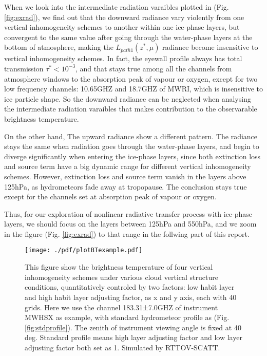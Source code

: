When we look into the intermediate radiation varaibles plotted in (Fig. \ref{fig:exrad}), we find out that the 
downward radiance vary violently from one vertical inhomogeneity schemes to another within one ice-phase layers, but convergent to 
the same value after going through the water-phase layers at the bottom of atmosphere, making the $L_{path1}(z^{*}, \mu)$ radiance 
become insensitive to vertical inhomogeneity schemes. In fact, the eyewall profile always has total transmission $\tau^{*} < 10^{-3}$, 
and that stays true among all the channels from atmosphere windows to the absorption peak of vapour or oxygen, except for 
two low frequency channels: 10.65GHZ and 18.7GHZ of MWRI, which is insensitive to ice particle shape. 
So the downward radiance can be neglected when analysing the intermediate radiation varaibles that makes contribution 
to the observarable brightness temperature.

On the other hand, The upward radiance show a different pattern. The radiance stays the same when radiation goes through the water-phase
layers, and begin to diverge significantly when entering the ice-phase layers, since both extinction loss and source term have a big
dynamic range for different vertical inhomogeneity schemes. However, extinction loss and source term vanish in the layers above 125hPa, 
as hydrometeors fade away at tropopause. The conclusion stays true except for the channels set at absorption peak of vapour or oxygen.

Thus, for our exploration of nonlinear radiative transfer process with ice-phase layers, we should focus on the layers between
125hPa and 550hPa, and we zoom in the figure (Fig. \ref{fig:exrad}) to that range in the follwing part of this report.

\begin{figure}[hbtp] 
\centering
\texttt{[image: ./pdf/plotBTexample.pdf]}
\caption{This figure show the brightness temperature of four vertical inhomogeneity schemes under various cloud vertical 
structure conditions, quantitatively controled by two factors: low habit layer and high habit layer adjusting factor, 
as x and y axis, each with 40 grids. Here we use the channel 183.31±7.0GHZ of instrument MWHSX as example, with standard hydrometeor 
profile as (Fig. \ref{fig:stdprofile}). The zenith of instrument viewing angle is fixed at 40 deg.
Standard profile means high layer adjusting factor and low layer adjusting factor both set as 1.
Simulated by RTTOV-SCATT.}
\label{fig:exBT}
\end{figure}

